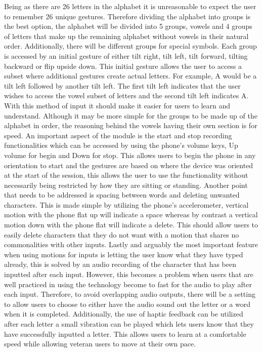 \documentclass[onecolumn, draftclsnofoot,10pt, compsoc]{IEEEtran}
\begin{document}
Being as there are 26 letters in the alphabet it is unreasonable to expect the user to remember 26 unique gestures. Therefore dividing the alphabet into groups is the best option, the alphabet will be divided into 5 groups, vowels and 4 groups of letters that make up the remaining alphabet without vowels in their natural order. Additionally, there will be different groups for special symbols. Each group is accessed by an initial gesture of either tilt right, tilt left, tilt forward, tilting backward or flip upside down. This initial gesture allows the user to access a subset where additional gestures create actual letters. For example, A would be a tilt left followed by another tilt left. The first tilt left indicates that the user wishes to access the vowel subset of letters and the second tilt left indicates A. With this method of input it should make it easier for users to learn and understand. Although it may be more simple for the groups to be made up of the alphabet in order, the reasoning behind the vowels having their own section is for speed. An important aspect of the module is the start and stop recording functionalities which can be accessed by using the phone's volume keys, Up volume for begin and Down for stop. This allows users to begin the phone in any orientation to start and the gestures are based on where the device was oriented at the start of the session, this allows the user to use the functionality without necessarily being restricted by how they are sitting or standing. Another point that needs to be addressed is spacing between words and deleting unwanted characters. This is made simple by utilizing the phone's accelerometer, vertical motion with the phone flat up will indicate a space whereas by contrast a vertical motion down with the phone flat will indicate a delete. This should allow users to easily delete characters that they do not want with a motion that shares no commonalities with other inputs. Lastly and arguably the most important feature when using motions for inputs is letting the user know what they have typed already, this is solved by an audio recording of the character that has been inputted after each input. However, this becomes a problem when users that are well practiced in using the technology become to fast for the audio to play after each input. Therefore, to avoid overlapping audio outputs, there will be a setting to allow users to choose to either have the audio sound out the letter or a word when it is completed. Additionally, the use of haptic feedback can be utilized after each letter a small vibration can be played which lets users know that they have successfully inputted a letter. This allows users to learn at a comfortable speed while allowing veteran users to move at their own pace.
\end{document}
